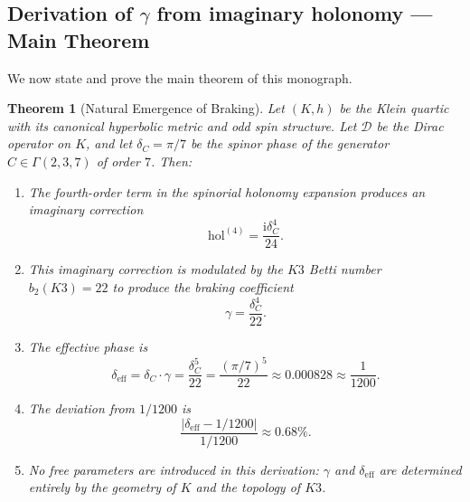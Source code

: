 \documentclass[12pt,a4paper]{article}
\newtheorem{theorem}{Theorem}[section]
\theoremstyle{definition}
\theoremstyle{remark}
\newcommand{\hol}{\mathrm{hol}}
\newcommand{\cD}{\mathcal{D}}
\newcommand{\ii}{\mathrm{i}}
\begin{document}
\subsection{Derivation of $\gamma$ from imaginary holonomy --- Main Theorem}

We now state and prove the main theorem of this monograph.

\begin{theorem}[Natural Emergence of Braking]
\label{thm:main}
Let $(K, h)$ be the Klein quartic with its canonical hyperbolic metric and odd spin structure. Let $\cD$ be the Dirac operator on $K$, and let $\delta_C = \pi/7$ be the spinor phase of the generator $C \in \Gamma(2,3,7)$ of order $7$. Then:
\begin{enumerate}[label=(\roman*)]
\item The fourth-order term in the spinorial holonomy expansion produces an imaginary correction
\begin{equation}
\hol^{(4)} = \frac{\ii \delta_C^4}{24}.
\end{equation}
\item This imaginary correction is modulated by the $K3$ Betti number $b_2(K3) = 22$ to produce the braking coefficient
\begin{equation}
\gamma = \frac{\delta_C^4}{22}.
\end{equation}
\item The effective phase is
\begin{equation}
\delta_{\mathrm{eff}} = \delta_C \cdot \gamma = \frac{\delta_C^5}{22} = \frac{(\pi/7)^5}{22} \approx 0.000828 \approx \frac{1}{1200}.
\end{equation}
\item The deviation from $1/1200$ is
\begin{equation}
\frac{|\delta_{\mathrm{eff}} - 1/1200|}{1/1200} \approx 0.68\%.
\end{equation}
\item No free parameters are introduced in this derivation: $\gamma$ and $\delta_{\mathrm{eff}}$ are determined entirely by the geometry of $K$ and the topology of $K3$.
\end{enumerate}
\end{theorem}
\end{document}
